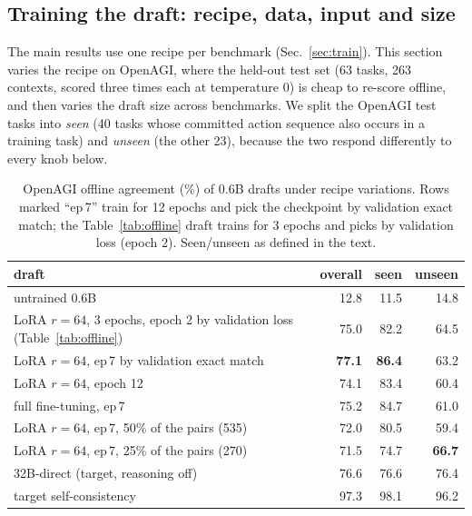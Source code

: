 \subsection{Training the draft: recipe, data, input and size}
\label{app:detail:training}
The main results use one recipe per benchmark (Sec.~\ref{sec:train}). This section varies the recipe
on OpenAGI, where the held-out test set (63 tasks, 263 contexts, scored three times each at temperature
0) is cheap to re-score offline, and then varies the draft size across benchmarks. We split the OpenAGI
test tasks into \emph{seen} (40 tasks whose committed action sequence also occurs in a training task) and
\emph{unseen} (the other 23), because the two respond differently to every knob below.

\begin{table}[t]
\centering
\caption{OpenAGI offline agreement (\%) of 0.6B drafts under recipe variations. Rows marked ``ep\,7''
train for 12 epochs and pick the checkpoint by validation exact match; the Table~\ref{tab:offline} draft
trains for 3 epochs and picks by validation loss (epoch 2). Seen/unseen as defined in the text.}
\label{tab:recipe}
\small
\begin{tabular}{lrrr}
\toprule
draft & overall & seen & unseen \\
\midrule
untrained 0.6B & 12.8 & 11.5 & 14.8 \\
LoRA $r{=}64$, 3 epochs, epoch 2 by validation loss (Table~\ref{tab:offline}) & 75.0 & 82.2 & 64.5 \\
LoRA $r{=}64$, ep\,7 by validation exact match & \textbf{77.1} & \textbf{86.4} & 63.2 \\
LoRA $r{=}64$, epoch 12 & 74.1 & 83.4 & 60.4 \\
full fine-tuning, ep\,7 & 75.2 & 84.7 & 61.0 \\
LoRA $r{=}64$, ep\,7, 50\% of the pairs (535) & 72.0 & 80.5 & 59.4 \\
LoRA $r{=}64$, ep\,7, 25\% of the pairs (270) & 71.5 & 74.7 & \textbf{66.7} \\
\midrule
32B-direct (target, reasoning off) & 76.6 & 76.6 & 76.4 \\
target self-consistency & 97.3 & 98.1 & 96.2 \\
\bottomrule
\end{tabular}
\end{table}

